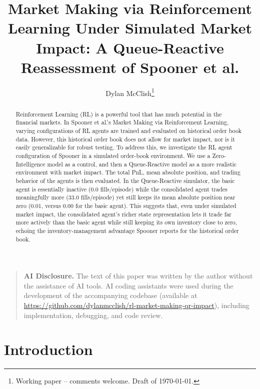 \documentclass{article}
\title{Market Making via Reinforcement Learning Under Simulated Market Impact: A Queue-Reactive Reassessment of Spooner et al.}
\author{Dylan McClish\thanks{Working paper -- comments welcome. Draft of \today.}}
\begin{document}
\maketitle

\begin{quote}
\small
\noindent\textbf{AI Disclosure.} The text of this paper was written by the author without the assistance of AI tools. AI coding assistants were used during the development of the accompanying codebase (available at \url{https://github.com/dylanmcclish/rl-market-making-qr-impact}), including implementation, debugging, and code review.
\end{quote}

\begin{abstract}
Reinforcement Learning (RL) is a powerful tool that has much potential in the financial markets. In Spooner et al.'s Market Making via Reinforcement Learning, varying configurations of RL agents are trained and evaluated on historical order book data. However, this historical order book does not allow for market impact, nor is it easily generalizable for robust testing. To address this, we investigate the RL agent configuration of Spooner in a simulated order-book environment. We use a Zero-Intelligence model as a control, and then a Queue-Reactive model as a more realistic environment with market impact. The total PnL, mean absolute position, and trading behavior of the agents is then evaluated. In the Queue-Reactive simulator, the basic agent is essentially inactive (0.0 fills/episode) while the consolidated agent trades meaningfully more (33.0 fills/episode) yet still keeps its mean absolute position near zero (0.01, versus 0.00 for the basic agent). This suggests that, even under simulated market impact, the consolidated agent's richer state representation lets it trade far more actively than the basic agent while still keeping its own inventory close to zero, echoing the inventory-management advantage Spooner reports for the historical order book.


\end{abstract}

\section{Introduction}
\end{document}
